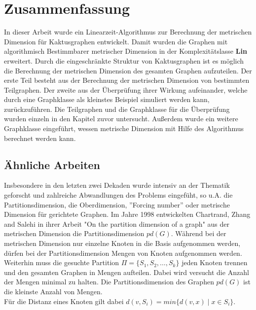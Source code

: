 \chapter{Zusammenfassung}
In dieser Arbeit wurde ein Linearzeit-Algorithmus zur Berechnung der metrischen Dimension für Kaktusgraphen entwickelt. Damit wurden die Graphen mit algorithmisch Bestimmbarer metrischer Dimension in der Komplexitätslasse \textbf{Lin} erweitert.\newline\newline
Durch die eingeschränkte Struktur von Kaktusgraphen ist es möglich die Berechnung der metrischen Dimension des gesamten Graphen aufzuteilen. Der erste Teil besteht aus der Berechnung der metrischen Dimension von bestimmten Teilgraphen. Der zweite aus der Überprüfung ihrer Wirkung aufeinander, welche durch eine Graphklasse als kleinstes Beispiel simuliert werden kann, zurückzuführen.\newline\newline
Die Teilgraphen und die Graphklasse für die Überprüfung wurden einzeln in den Kapitel zuvor untersucht. Außerdem wurde ein weitere Graphklasse eingeführt, wessen metrische Dimension mit Hilfe des Algorithmus berechnet werden kann.
\section{Ähnliche Arbeiten}
Insbesondere in den letzten zwei Dekaden wurde intensiv an der Thematik geforscht und zahlreiche Abwandlungen des Problems eingefüht, so u.A. die Partitionsdimension, die Oberdimension, ''Forcing number'' oder metrische Dimension für gerichtete Graphen. 
\newline Im Jahre 1998 entwickelten Chartrand, Zhang and Salehi in ihrer Arbeit "On the partition dimension of a graph" \cite{partit} aus der metrischen Dimension die Partitionsdimension $pd(G)$. Während bei der metrischen Dimension nur einzelne Knoten in die Basis aufgenommen werden, dürfen bei der Partitionsdimension Mengen von Knoten aufgenommen werden. Weiterhin muss die gesuchte Partition $\Pi = \{S_1, S_2, \ldots, S_k\}$ jeden Knoten trennen und den gesamten Graphen in Mengen aufteilen. Dabei wird versucht die Anzahl der Mengen minimal zu halten. Die Partitionsdimension des Graphen $pd(G)$ ist die kleinste Anzahl von Mengen.\\
Für die Distanz eines Knoten gilt dabei $d(v,S_i)=min\{d(v,x) \mid x\in S_i\}$.\newline
\newline\newline 

